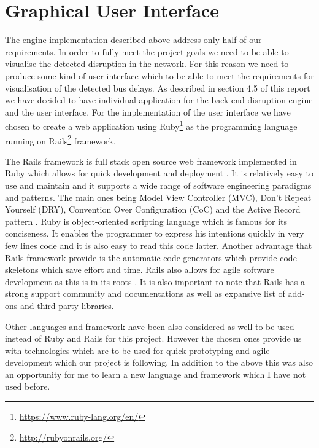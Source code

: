 \FloatBarrier
\section{Graphical User Interface}
The engine implementation described above address only half of our requirements. In order to fully meet the project goals we need to be able to visualise the detected disruption in the network. For this reason we need to produce some kind of user interface which to be able to meet the requirements for visualisation of the detected bus delays. As described in section 4.5 of this report we have decided to have individual application for the back-end disruption engine and the user interface. For the implementation of the user interface we have chosen to create a web application using Ruby\footnote{\url{https://www.ruby-lang.org/en/}} as the programming language running on Rails\footnote{\url{http://rubyonrails.org/}} framework.

The Rails framework is full stack open source web framework implemented in Ruby which allows for quick development and deployment \cite{guide2006agile}. It is relatively easy to use and maintain and it supports a wide range of software engineering paradigms and patterns. The main ones being Model View Controller (MVC), Don't Repeat Yourself (DRY), Convention Over Configuration (CoC) and the Active Record pattern \cite{fowler2003patterns}. Ruby is object-oriented scripting language which is famous for its conciseness. It enables the programmer to express his intentions quickly in very few lines code and it is also easy to read this code latter. Another advantage that Rails framework provide is the automatic code generators which provide code skeletons which save effort and time. Rails also allows for agile software development as this is in its roots \cite{guide2006agile}. It is also important to note that Rails has a strong support community and documentations as well as expansive list of add-ons and third-party libraries.

Other languages and framework have been also considered as well to be used instead of Ruby and Rails for this project. However the chosen ones provide us with technologies which are to be used for quick prototyping and agile development which our project is following. In addition to the above this was also an opportunity for me to learn a new language and framework which I have not used before.

